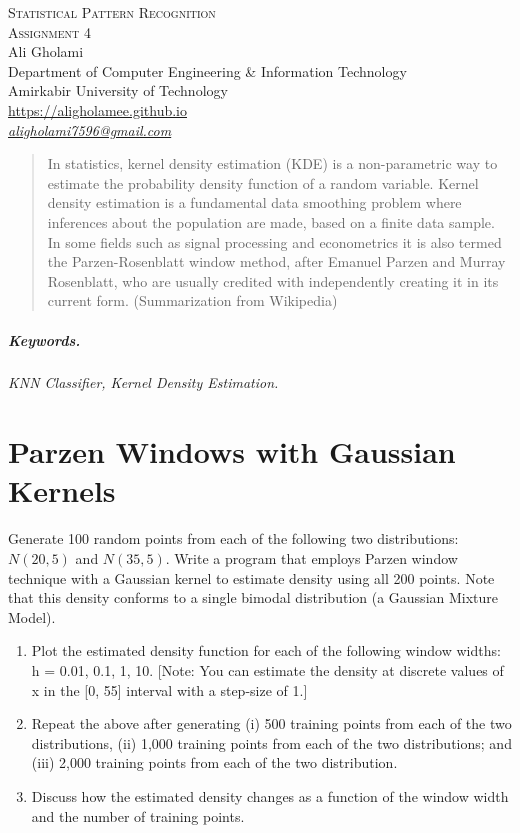 \documentclass[12pt]{article}
\numberwithin{equation}{section}
\numberwithin{table}{section}
\numberwithin{figure}{section}
\begin{document}

\begin{center}
\textsc{\Large Statistical Pattern Recognition} \\[2pt]
	\textsc{\large Assignment 4}\\
	\vspace{0.5cm}
  Ali Gholami \\[6pt]
  Department of Computer Engineering \& Information Technology\\
  Amirkabir University of Technology  \\[6pt]
  \def\UrlFont{\em}
  \url{https://aligholamee.github.io}\\
    \href{mailto:aligholami7596@gmail.com}{\textit{aligholami7596@gmail.com}}
\end{center}

\begin{abstract}
In statistics, kernel density estimation (KDE) is a non-parametric way to estimate the probability density function of a random variable. Kernel density estimation is a fundamental data smoothing problem where inferences about the population are made, based on a finite data sample. In some fields such as signal processing and econometrics it is also termed the Parzen-Rosenblatt window method, after Emanuel Parzen and Murray Rosenblatt, who are usually credited with independently creating it in its current form. (Summarization from Wikipedia)
\end{abstract}

\subparagraph{Keywords.} \textit{KNN Classifier, Kernel Density Estimation.}

\section{Parzen Windows with Gaussian Kernels}
Generate 100 random points from each of the following two distributions: $N(20, 5)$ and $N(35, 5)$. Write a program that employs Parzen window technique with a Gaussian kernel to estimate density using all 200 points. Note that this density conforms to a single bimodal distribution (a Gaussian Mixture Model).

\begin{enumerate}[label=(\alph*)]
	\item Plot the estimated density function for each of the following window widths: h = 0.01, 0.1, 1, 10. [Note: You can estimate the density at discrete values of x in the [0, 55] interval with a step-size of 1.]
	
	\item Repeat the above after generating (i) 500 training points from each of the two distributions, (ii) 1,000 training points from each of the two distributions; and (iii) 2,000 training points from each of the two distribution.
	
	\item Discuss how the estimated density changes as a function of the window width and the number of training points.
\end{enumerate}
\end{document}
